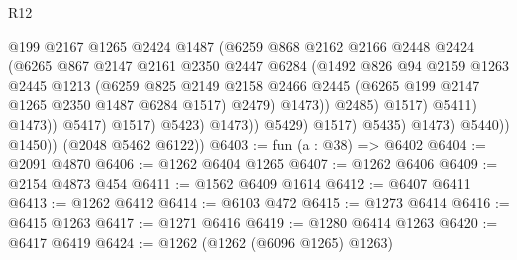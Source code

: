 \begin{lexlean}{R12}
\begin{coremodule}
                                        @199
                                        @2167
                                        @1265
                                        @2424
                                        @1487
                                        (@6259
                                          @868
                                          @2162
                                          @2166
                                          @2448
                                          @2424
                                          (@6265
                                            @867
                                            @2147
                                            @2161
                                            @2350
                                            @2447
                                            @6284
                                            (@1492
                                              @826
                                              @94
                                              @2159
                                              @1263
                                              @2445
                                              @1213
                                              (@6259
                                                @825
                                                @2149
                                                @2158
                                                @2466
                                                @2445
                                                (@6265 @199 @2147 @1265 @2350 @1487 @6284 @1517)
                                                @2479)
                                              @1473))
                                          @2485)
                                        @1517)
                                      @5411)
                                    @1473))
                                @5417)
                              @1517)
                            @5423)
                          @1473))
                      @5429)
                    @1517)
                  @5435)
                @1473)
              @5440))
          @1450))
      (@2048 @5462 @6122))
@6403 := fun (a : @38) => @6402
@6404 := @2091 @4870
@6406 := @1262 @6404 @1265
@6407 := @1262 @6406
@6409 := @2154 @4873 @454
@6411 := @1562 @6409 @1614
@6412 := @6407 @6411
@6413 := @1262 @6412
@6414 := @6103 @472
@6415 := @1273 @6414
@6416 := @6415 @1263
@6417 := @1271 @6416
@6419 := @1280 @6414 @1263
@6420 := @6417 @6419
@6424 := @1262 (@1262 (@6096 @1265) @1263)

\end{coremodule}
\end{lexlean}
